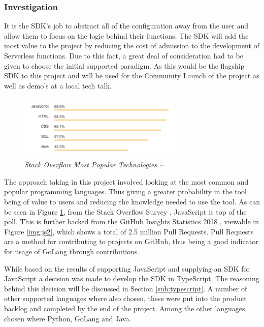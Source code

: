 \subsubsection{Investigation}
\label{sub:sdk_invest}
 It is the \gls{SDK}'s job to abstract all of the configuration away from the user and allow them to focus on the logic behind their functions. The \gls{SDK} will add the most value to the project by reducing the cost of admission to the development of \gls{Serverless} functions. Due to this fact, a great deal of consideration had to be given to choose the initial supported paradigm. As this would be the flagship \gls{SDK} to this project and will be used for the Community Launch of the project as well as demo's at a local tech talk. 
\begin{figure}[!ht]
\centering
\includegraphics*[width=0.7\textwidth]{images/a3.png}
\caption{\em Stack Overflow Most Popular Technologies --  \cite{overflow_2018}}
\label{img:js1}
\end{figure}

The approach taking in this project involved looking at the most common and popular programming languages. Thus giving a greater probability in the tool being of value to users and reducing the knowledge needed to use the tool. As can be seen in Figure \ref{img:js1}, from the Stack Overflow Survey \citep{overflow_2018}, JavaScript is top of the poll. This is further backed from the \gls{GitHub} Insights Statistics 2018 \cite{octoverse_2017_2018}, viewable in Figure \ref{img:js2}, which shows a total of 2.5 million Pull Requests. Pull Requests are a method for contributing to projects on \gls{GitHub}, thus being a good indicator for usage of \gls{GoLang} through contributions.

While based on the results of supporting JavaScript and supplying an SDK for JavaScript a decision was made to develop the SDK in TypeScript. The reasoning behind this decision will be discussed in Section \ref{sub:typescript}. A number of other supported languages where also chosen, these were put into the product backlog and completed by the end of the project. Among the other languages chosen where Python, \gls{GoLang} and Java.

